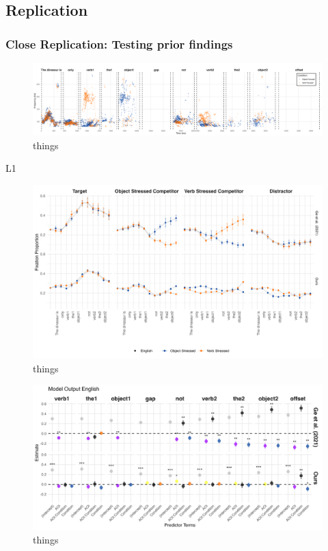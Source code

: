 \subsection{Replication}

\subsubsection{Close Replication: Testing prior findings}
\begin{figure}[p]  %
    \centering
    \includegraphics[width=\textwidth,height=\textheight,keepaspectratio]{viz/accoustic.png}
    \caption{things}
    \label{fig:acoustic}
\end{figure}

L1 

\begin{figure}[p]  %
    \centering
    \includegraphics[width=\textwidth,height=\textheight,keepaspectratio]{viz/english_fix.png}
    \caption{things}
    \label{fig:english_fix}
\end{figure}

\begin{figure}[p]  %
    \centering
    \includegraphics[width=\textwidth,height=\textheight,keepaspectratio]{viz/model_plot_english.png}
    \caption{things}
    \label{fig:model_plot_english}
\end{figure}

